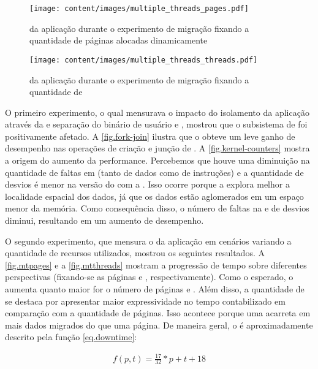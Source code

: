\begin{figure}[tb]
    \centering
    \texttt{[image: content/images/multiple\_threads\_pages.pdf]}
    \caption{\Downtime da aplicação durante o experimento de migração fixando a quantidade de páginas alocadas dinamicamente}
    \label{fig.mtpages}
\end{figure}

\begin{figure}[tb]
    \centering
    \texttt{[image: content/images/multiple\_threads\_threads.pdf]}
    \caption{\Downtime da aplicação durante o experimento de migração fixando a quantidade de \threads}
    \label{fig.mtthreads}
\end{figure}

O primeiro experimento, o qual mensurava o impacto do isolamento da aplicação através da \uarea e separação do binário de usuário e , mostrou que o subsistema de \threads foi positivamente afetado. A \autoref{fig.fork-join} ilustra que o \nanvix obteve um leve ganho de desempenho nas operações de criação e junção de \threads. A \autoref{fig.kernel-counters} mostra a origem do aumento da performance. Percebemos que houve uma diminuição na quantidade de faltas em \cache (tanto de dados como de instruções) e a quantidade de desvios é menor na versão do \nanvix com a \uarea. Isso ocorre porque a \uarea explora melhor a localidade espacial dos dados, já que os dados estão aglomerados em um espaço menor da memória. Como consequência disso, o número de faltas na \cache e de desvios diminui, resultando em um aumento de desempenho.

O segundo experimento, que mensura o \downtime da aplicação em cenários variando a quantidade de recursos utilizados, mostrou os seguintes resultados. A \autoref{fig.mtpages} e a \autoref{fig.mtthreads} mostram a progressão de tempo sobre diferentes perspectivas (fixando-se as páginas e \threads, respectivamente). Como o esperado, o \downtime aumenta quanto maior for o número de páginas e \threads. Além disso, a quantidade de \threads se destaca por apresentar maior expressividade no tempo contabilizado em comparação com a quantidade de páginas. Isso acontece porque uma \thread acarreta em mais dados migrados do que uma página. De maneira geral, o \downtime é aproximadamente descrito pela função \ref{eq.downtime}:

\begin{equation}\label{eq.downtime}
    \begin{split}
        f(p, t) = \frac{17}{32}*p+t+18
    \end{split}
\end{equation}

